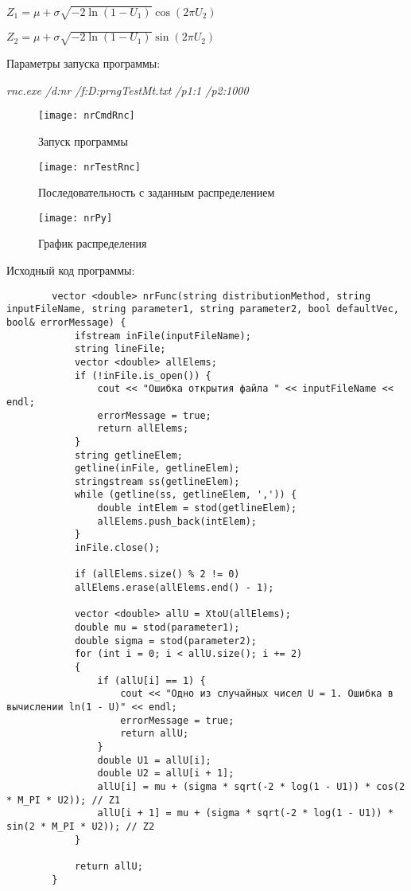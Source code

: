 \documentclass[bachelor, och, coursework]{shiza}
\begin{document}
	\begin{center}
		$Z_1 = \mu + \sigma \sqrt{-2 \ln(1 - U_1)} \cos(2 \pi U_2)$
	\end{center}

	\begin{center}
		$Z_2 = \mu + \sigma \sqrt{-2 \ln(1 - U_1)} \sin(2 \pi U_2)$
	\end{center}
	
	Параметры запуска программы:
	
	\textit{rnc.exe /d:nr /f:D:prngTestMt.txt /p1:1 /p2:1000}
	
	
	\begin{figure}[H]
		\centering
		\texttt{[image: nrCmdRnc]}
		\caption{Запуск программы}
		\label{fig:nrCmdRnc}
	\end{figure}
	
	\begin{figure}[H]
		\centering
		\texttt{[image: nrTestRnc]}
		\caption{Последовательность с заданным распределением}
		\label{fig:nrTestRnc}
	\end{figure}
	
	\begin{figure}[H]
		\centering
		\texttt{[image: nrPy]}
		\caption{График распределения}
		\label{fig:nrPy}
	\end{figure}
	
	Исходный код программы:
	
	\begin{verbatim}
		vector <double> nrFunc(string distributionMethod, string inputFileName, string parameter1, string parameter2, bool defaultVec, bool& errorMessage) {
			ifstream inFile(inputFileName);
			string lineFile;
			vector <double> allElems;
			if (!inFile.is_open()) {
				cout << "Ошибка открытия файла " << inputFileName << endl;
				errorMessage = true;
				return allElems;
			}
			string getlineElem;
			getline(inFile, getlineElem);
			stringstream ss(getlineElem);
			while (getline(ss, getlineElem, ',')) {
				double intElem = stod(getlineElem);
				allElems.push_back(intElem);
			}
			inFile.close();
			
			if (allElems.size() % 2 != 0)
			allElems.erase(allElems.end() - 1);
			
			vector <double> allU = XtoU(allElems);
			double mu = stod(parameter1);
			double sigma = stod(parameter2);
			for (int i = 0; i < allU.size(); i += 2)
			{
				if (allU[i] == 1) {
					cout << "Одно из случайных чисел U = 1. Ошибка в вычислении ln(1 - U)" << endl;
					errorMessage = true;
					return allU;
				}
				double U1 = allU[i];
				double U2 = allU[i + 1];
				allU[i] = mu + (sigma * sqrt(-2 * log(1 - U1)) * cos(2 * M_PI * U2)); // Z1
				allU[i + 1] = mu + (sigma * sqrt(-2 * log(1 - U1)) * sin(2 * M_PI * U2)); // Z2
			}
			
			return allU;
		}
	\end{verbatim}
\end{document}
